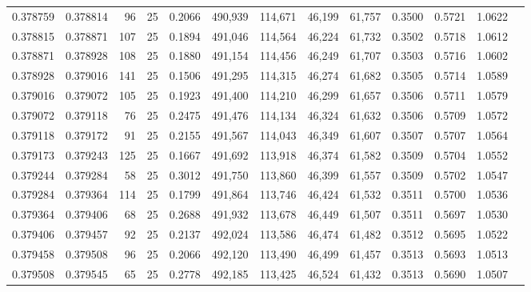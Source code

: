 \begin{tabular}{rrrrrrrrrrrrr}
0.378759 & 0.378814 &    96 &  25 &                                     0.2066 & 490,939 & 114,671 &  46,199 &  61,757 & 0.3500 & 0.5721 & 1.0622 \\
0.378815 & 0.378871 &   107 &  25 &                                     0.1894 & 491,046 & 114,564 &  46,224 &  61,732 & 0.3502 & 0.5718 & 1.0612 \\
0.378871 & 0.378928 &   108 &  25 &                                     0.1880 & 491,154 & 114,456 &  46,249 &  61,707 & 0.3503 & 0.5716 & 1.0602 \\
0.378928 & 0.379016 &   141 &  25 &                                     0.1506 & 491,295 & 114,315 &  46,274 &  61,682 & 0.3505 & 0.5714 & 1.0589 \\
0.379016 & 0.379072 &   105 &  25 &                                     0.1923 & 491,400 & 114,210 &  46,299 &  61,657 & 0.3506 & 0.5711 & 1.0579 \\
0.379072 & 0.379118 &    76 &  25 &                                     0.2475 & 491,476 & 114,134 &  46,324 &  61,632 & 0.3506 & 0.5709 & 1.0572 \\
0.379118 & 0.379172 &    91 &  25 &                                     0.2155 & 491,567 & 114,043 &  46,349 &  61,607 & 0.3507 & 0.5707 & 1.0564 \\
0.379173 & 0.379243 &   125 &  25 &                                     0.1667 & 491,692 & 113,918 &  46,374 &  61,582 & 0.3509 & 0.5704 & 1.0552 \\
0.379244 & 0.379284 &    58 &  25 &                                     0.3012 & 491,750 & 113,860 &  46,399 &  61,557 & 0.3509 & 0.5702 & 1.0547 \\
0.379284 & 0.379364 &   114 &  25 &                                     0.1799 & 491,864 & 113,746 &  46,424 &  61,532 & 0.3511 & 0.5700 & 1.0536 \\
0.379364 & 0.379406 &    68 &  25 &                                     0.2688 & 491,932 & 113,678 &  46,449 &  61,507 & 0.3511 & 0.5697 & 1.0530 \\
0.379406 & 0.379457 &    92 &  25 &                                     0.2137 & 492,024 & 113,586 &  46,474 &  61,482 & 0.3512 & 0.5695 & 1.0522 \\
0.379458 & 0.379508 &    96 &  25 &                                     0.2066 & 492,120 & 113,490 &  46,499 &  61,457 & 0.3513 & 0.5693 & 1.0513 \\
0.379508 & 0.379545 &    65 &  25 &                                     0.2778 & 492,185 & 113,425 &  46,524 &  61,432 & 0.3513 & 0.5690 & 1.0507 \\

\end{tabular}
